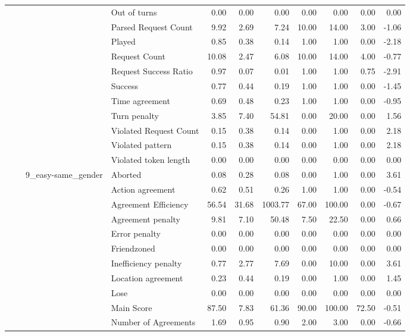 \begin{tabular}{llllrrrrrrr}
 &  &  & Out of turns & 0.00 & 0.00 & 0.00 & 0.00 & 0.00 & 0.00 & 0.00 \\
 &  &  & Parsed Request Count & 9.92 & 2.69 & 7.24 & 10.00 & 14.00 & 3.00 & -1.06 \\
 &  &  & Played & 0.85 & 0.38 & 0.14 & 1.00 & 1.00 & 0.00 & -2.18 \\
 &  &  & Request Count & 10.08 & 2.47 & 6.08 & 10.00 & 14.00 & 4.00 & -0.77 \\
 &  &  & Request Success Ratio & 0.97 & 0.07 & 0.01 & 1.00 & 1.00 & 0.75 & -2.91 \\
 &  &  & Success & 0.77 & 0.44 & 0.19 & 1.00 & 1.00 & 0.00 & -1.45 \\
 &  &  & Time agreement & 0.69 & 0.48 & 0.23 & 1.00 & 1.00 & 0.00 & -0.95 \\
 &  &  & Turn penalty & 3.85 & 7.40 & 54.81 & 0.00 & 20.00 & 0.00 & 1.56 \\
 &  &  & Violated Request Count & 0.15 & 0.38 & 0.14 & 0.00 & 1.00 & 0.00 & 2.18 \\
 &  &  & Violated pattern & 0.15 & 0.38 & 0.14 & 0.00 & 1.00 & 0.00 & 2.18 \\
 &  &  & Violated token length & 0.00 & 0.00 & 0.00 & 0.00 & 0.00 & 0.00 & 0.00 \\
\cline{3-11}
 &  & \multirow[t]{27}{*}{9_easy-same_gender} & Aborted & 0.08 & 0.28 & 0.08 & 0.00 & 1.00 & 0.00 & 3.61 \\
 &  &  & Action agreement & 0.62 & 0.51 & 0.26 & 1.00 & 1.00 & 0.00 & -0.54 \\
 &  &  & Agreement Efficiency & 56.54 & 31.68 & 1003.77 & 67.00 & 100.00 & 0.00 & -0.67 \\
 &  &  & Agreement penalty & 9.81 & 7.10 & 50.48 & 7.50 & 22.50 & 0.00 & 0.66 \\
 &  &  & Error penalty & 0.00 & 0.00 & 0.00 & 0.00 & 0.00 & 0.00 & 0.00 \\
 &  &  & Friendzoned & 0.00 & 0.00 & 0.00 & 0.00 & 0.00 & 0.00 & 0.00 \\
 &  &  & Inefficiency penalty & 0.77 & 2.77 & 7.69 & 0.00 & 10.00 & 0.00 & 3.61 \\
 &  &  & Location agreement & 0.23 & 0.44 & 0.19 & 0.00 & 1.00 & 0.00 & 1.45 \\
 &  &  & Lose & 0.00 & 0.00 & 0.00 & 0.00 & 0.00 & 0.00 & 0.00 \\
 &  &  & Main Score & 87.50 & 7.83 & 61.36 & 90.00 & 100.00 & 72.50 & -0.51 \\
 &  &  & Number of Agreements & 1.69 & 0.95 & 0.90 & 2.00 & 3.00 & 0.00 & -0.66 \\

\end{tabular}
